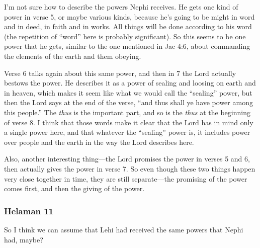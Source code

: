 		\begin{compactdesc}
		
		\item[1--11$\vert$]
		\begin{compactdesc}
		\item[Receiving power from the Lord] I'm not sure how to describe the powers Nephi receives. He gets one kind of power in verse 5, or maybe various kinds, because he's going to be might in word and in deed, in faith and in works. All things will be done according to his word (the repetition of ``word'' here is probably significant). So this seems to be one power that he gets, similar to the one mentioned in Jac 4:6, about commanding the elements of the earth and them obeying.
		
		Verse 6 talks again about this same power, and then in 7 the Lord actually bestows the power. He describes it as a power of sealing and loosing on earth and in heaven, which makes it seem like what we would call the ``sealing'' power, but then the Lord says at the end of the verse, ``and thus shall ye have power among this people.'' The \textit{thus} is the important part, and so is the \textit{thus} at the beginning of verse 8. I think that those words make it clear that the Lord has in mind only a single power here, and that whatever the ``sealing'' power is, it includes power over people and the earth in the way the Lord describes here.
		
		Also, another interesting thing---the Lord promises the power in verses 5 and 6, then actually gives the power in verse 7. So even though these two things happen very close together in time, they are still separate---the promising of the power comes first, and then the giving of the power.
		\end{compactdesc}
		
		\end{compactdesc}
		
	\subsubsection{Helaman 11} %
	
		\begin{compactdesc}
		
		\item[19$\vert$]
		\begin{compactdesc}
		\item[not a whit behind him] So I think we can assume that Lehi had received the same powers that Nephi had, maybe?
		\end{compactdesc}
		
		\end{compactdesc}
		
